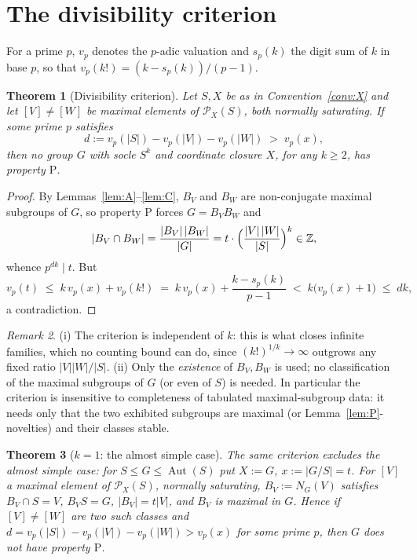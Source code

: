 \documentclass[11pt]{amsart}
\newtheorem{theorem}{Theorem}[section]
\theoremstyle{definition}
\theoremstyle{remark}
\newtheorem{remark}[theorem]{Remark}
\DeclareMathOperator{\Aut}{Aut}
\newcommand{\Z}{\mathbb{Z}}
\newcommand{\Pos}{\mathcal{P}}
\newcommand{\vp}[1]{v_{#1}}
\begin{document}
\section{The divisibility criterion}\label{sec:criterion}

For a prime $p$, $\vp{p}$ denotes the $p$-adic valuation and $s_p(k)$ the
digit sum of $k$ in base $p$, so that $\vp{p}(k!)=(k-s_p(k))/(p-1)$.

\begin{theorem}[Divisibility criterion]\label{thm:D}
Let $S,X$ be as in Convention~\ref{conv:X} and let $[V]\neq[W]$ be
maximal elements of $\Pos_X(S)$, both normally saturating. If some prime
$p$ satisfies
\[
d:=\vp{p}(|S|)-\vp{p}(|V|)-\vp{p}(|W|)\;>\;\vp{p}(x),
\]
then no group $G$ with socle $S^k$ and coordinate closure $X$, for any
$k\geq2$, has property $\mathrm{P}$.
\end{theorem}

\begin{proof}
By Lemmas~\ref{lem:A}--\ref{lem:C}, $B_V$ and $B_W$ are non-conjugate
maximal subgroups of $G$, so property $\mathrm{P}$ forces $G=B_VB_W$ and
\[
|B_V\cap B_W|=\frac{|B_V|\,|B_W|}{|G|}
 = t\cdot\Bigl(\frac{|V|\,|W|}{|S|}\Bigr)^{k}\in\Z ,
\]
whence $p^{dk}\mid t$. But
\[
\vp{p}(t)\;\leq\;k\,\vp{p}(x)+\vp{p}(k!)
 \;=\;k\,\vp{p}(x)+\frac{k-s_p(k)}{p-1}
 \;<\;k\bigl(\vp{p}(x)+1\bigr)\;\leq\;dk ,
\]
a contradiction.
\end{proof}

\begin{remark}
(i) The criterion is independent of $k$: this is what closes infinite
families, which no counting bound can do, since $(k!)^{1/k}\to\infty$
outgrows any fixed ratio $|V||W|/|S|$. (ii) Only the \emph{existence} of
$B_V,B_W$ is used; no classification of the maximal subgroups of $G$
(or even of $S$) is needed. In particular the criterion is insensitive
to completeness of tabulated maximal-subgroup data: it needs only that
the two exhibited subgroups are maximal (or Lemma~\ref{lem:P}-novelties)
and their classes stable.
\end{remark}

\begin{theorem}[$k=1$: the almost simple case]\label{thm:Dprime}
The same criterion excludes the almost simple case: for
$S\leq G\leq\Aut(S)$ put $X:=G$, $x:=|G/S|=t$. For $[V]$ a maximal
element of $\Pos_X(S)$, normally saturating, $B_V:=N_G(V)$ satisfies
$B_V\cap S=V$, $B_VS=G$, $|B_V|=t|V|$, and $B_V$ is maximal in $G$.
Hence if $[V]\neq[W]$ are two such classes and
$d=\vp{p}(|S|)-\vp{p}(|V|)-\vp{p}(|W|)>\vp{p}(x)$ for some prime $p$,
then $G$ does not have property $\mathrm{P}$.
\end{theorem}
\end{document}
